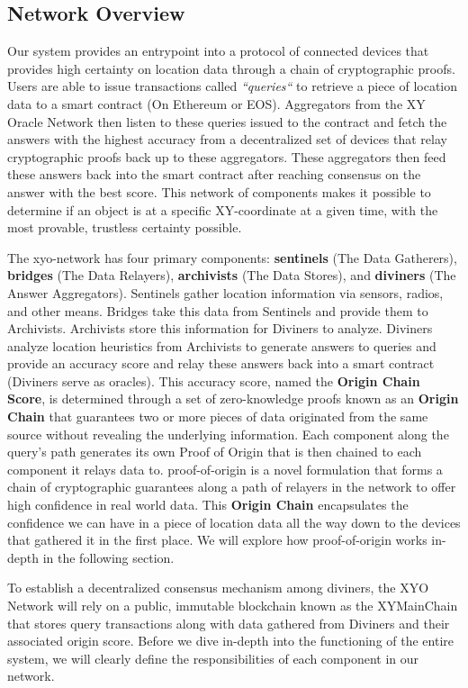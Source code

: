 \documentclass{article}
\begin{document}
\subsection {Network Overview}
Our system provides an entrypoint into a protocol of connected devices that provides high certainty on location data through a chain of cryptographic proofs. Users are able to issue transactions called \textit{``queries``} to retrieve a piece of location data to a smart contract (On Ethereum or EOS). Aggregators from the XY Oracle Network then listen to these queries issued to the contract and fetch the answers with the highest accuracy from a decentralized set of devices that relay cryptographic proofs back up to these aggregators. These aggregators then feed these answers back into the smart contract after reaching consensus on the answer with the best score. This network of components makes it possible to determine if an object is at a specific XY-coordinate at a given time, with the most provable, trustless certainty possible.

The \Gls{xyo-network} has four primary components: \textbf{\Glspl{sentinel}} (The Data Gatherers), \textbf{\Glspl{bridge}} (The Data Relayers), \textbf{\Glspl{archivist}} (The Data Stores), and \textbf{\Glspl{diviner}} (The Answer Aggregators). Sentinels gather location information via sensors, radios, and other means. Bridges take this data from Sentinels and provide them to Archivists. Archivists store this information for Diviners to analyze. Diviners analyze location heuristics from Archivists to generate answers to queries and provide an accuracy score and relay these answers back into a smart contract (Diviners serve as oracles). This accuracy score, named the \textbf{Origin Chain Score}, is determined through a set of zero-knowledge proofs known as an \textbf{Origin Chain} that guarantees two or more pieces of data originated from the same source without revealing the underlying information. Each component along the query's path generates its own Proof of Origin that is then chained to each component it relays data to. \Gls{proof-of-origin} is a novel formulation that forms a chain of cryptographic guarantees along a path of relayers in the network to offer high confidence in real world data. This \textbf{Origin Chain} encapsulates the confidence we can have in a piece of location data all the way down to the devices that gathered it in the first place. We will explore how \Gls{proof-of-origin} works in-depth in the following section.

To establish a decentralized consensus mechanism among diviners, the XYO Network will rely on a public, immutable blockchain known as the XYMainChain that stores query transactions along with data gathered from Diviners and their associated origin score. Before we dive in-depth into the functioning of the entire system, we will clearly define the responsibilities of each component in our network.
\end{document}
